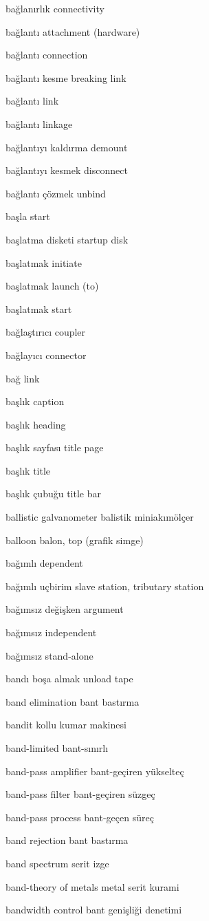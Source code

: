 \documentclass[12pt,fleqn]{article}\usepackage{../../common}
\begin{document}
bağlanırlık connectivity

bağlantı attachment (hardware)

bağlantı connection

bağlantı kesme breaking link

bağlantı link

bağlantı linkage

bağlantıyı kaldırma demount

bağlantıyı kesmek disconnect

bağlantı çözmek unbind

başla start

başlatma disketi startup disk

başlatmak initiate

başlatmak launch (to)

başlatmak start

bağlaştırıcı coupler

bağlayıcı connector

bağ link

başlık caption

başlık heading

başlık sayfası title page

başlık title

başlık çubuğu title bar

ballistic galvanometer balistik miniakımölçer

balloon balon, top (grafik simge)

bağımlı dependent

bağımlı uçbirim slave station, tributary station

bağımsız değişken argument

bağımsız independent

bağımsız stand-alone

bandı boşa almak unload tape

band elimination bant bastırma

bandit kollu kumar makinesi

band-limited bant-sınırlı

band-pass amplifier bant-geçiren yükselteç

band-pass filter bant-geçiren süzgeç

band-pass process bant-geçen süreç

band rejection bant bastırma

band spectrum serit izge

band-theory of metals metal serit kurami

bandwidth control bant genişliği denetimi
\end{document}
